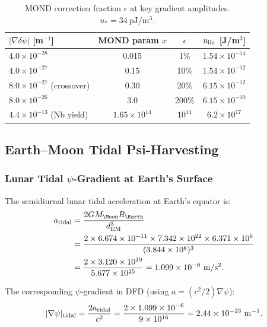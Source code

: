 \documentclass[aps,prd,twocolumn,superscriptaddress]{revtex4-2}
\newcommand{\deltapsi}{\delta\psi}
\begin{document}
\begin{table}[h]
\caption{MOND correction fraction $\epsilon$ at key gradient amplitudes.
$u_* = 34~\mathrm{pJ/m^3}$.}
\label{tab:mond}
\begin{ruledtabular}
\begin{tabular}{lccc}
$|\nabla\deltapsi|$ [m$^{-1}$] & MOND param $x$ & $\epsilon$ & $u_{\rm lin}$ [J/m$^3$] \\
\hline
$4.0\times 10^{-28}$ & 0.015 & 1\% & $1.54\times 10^{-14}$ \\
$4.0\times 10^{-27}$ & 0.15 & 10\% & $1.54\times 10^{-12}$ \\
$8.0\times 10^{-27}$ (crossover) & 0.30 & 20\% & $6.15\times 10^{-12}$ \\
$8.0\times 10^{-26}$ & 3.0 & 200\% & $6.15\times 10^{-10}$ \\
$4.4\times 10^{-13}$ (Nb yield) & $1.65\times 10^{14}$ & $10^{14}$ & $6.2\times 10^{17}$ \\
\end{tabular}
\end{ruledtabular}
\end{table}

\subsection{Earth--Moon Tidal Psi-Harvesting}
\label{sec:tidal}

\subsubsection{Lunar Tidal $\psi$-Gradient at Earth's Surface}

The semidiurnal lunar tidal acceleration at Earth's equator is:
\begin{align}
a_{\rm tidal} &= \frac{2G M_\Moon R_\Earth}{d_{\rm EM}^3} \notag\\
&= \frac{2\times 6.674\times 10^{-11}\times 7.342\times 10^{22}
\times 6.371\times 10^6}{(3.844\times 10^8)^3} \notag\\
&= \frac{2\times 3.120\times 10^{19}}{5.677\times 10^{25}}
= 1.099\times 10^{-6}~\mathrm{m/s^2}.
\end{align}

The corresponding $\psi$-gradient in DFD (using $a = (c^2/2)\nabla\psi$):
\begin{equation}
|\nabla\psi|_{\rm tidal} = \frac{2a_{\rm tidal}}{c^2}
= \frac{2\times 1.099\times 10^{-6}}{9\times 10^{16}}
= 2.44\times 10^{-23}~\mathrm{m^{-1}}.
\end{equation}
\end{document}
